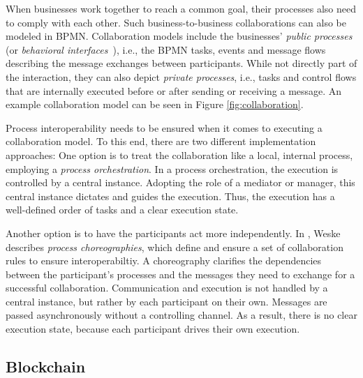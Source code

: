\documentclass[runningheads]{llncs}
\begin{document}
When businesses work together to reach a common goal, their processes also need to comply with each other.
Such business-to-business collaborations can also be modeled in BPMN.
Collaboration models include the businesses' \emph{public processes} (or \emph{behavioral interfaces}~\cite{Weske2012}), i.e., the BPMN tasks, events and message flows describing the message exchanges between participants.
While not directly part of the interaction, they can also depict \emph{private processes}, i.e., tasks and control flows that are internally executed before or after sending or receiving a message.
An example collaboration model can be seen in Figure \ref{fig:collaboration}.

Process interoperability needs to be ensured when it comes to executing a collaboration model.
To this end, there are two different implementation approaches:
One option is to treat the collaboration like a local, internal process, employing a \emph{process orchestration}.
In a process orchestration, the execution is controlled by a central instance.
Adopting the role of a mediator or manager, this central instance dictates and guides the execution.
Thus, the execution has a well-defined order of tasks and a clear execution state.

Another option is to have the participants act more independently.
In \cite{Weske2012}, Weske describes \emph{process choreographies}, which define and ensure a set of collaboration rules to ensure interoperabiltiy.
A choreography clarifies the dependencies between the participant's processes and the messages they need to exchange for a successful collaboration.
Communication and execution is not handled by a central instance, but rather by each participant on their own.
Messages are passed asynchronously without a controlling channel.
As a result, there is no clear execution state, because each participant drives their own execution.

\subsection{Blockchain}
\end{document}
